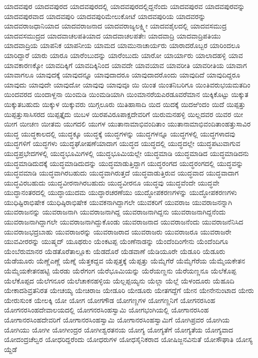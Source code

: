 {ಯಾದವಪುರ
ಯಾದವಪುರದ
ಯಾದವಪುರದಲ್ಲಿ
ಯಾದವಪುರದಲ್ಲಿದ್ದನೆಂದು
ಯಾದವಪುರವ
ಯಾದವಪುರವನ್ನು
ಯಾದವಪುರವಾದ
ಯಾದವಪುರಿ
ಯಾದವಪುರಿಮೇಲುಕೋಟೆ
ಯಾದವಪುರಿಯ
ಯಾದವರನ್ನು
ಯಾದವರಾಜಧಾನಿಯಾದ
ಯಾದವರಾಜನಾದ
ಯಾದವರಾಜ್ಯಲಕ್ಷ್ಮೀ
ಯಾದವಶೈಲದಲ್ಲಿ
ಯಾದವಸಮುದ್ರ
ಯಾದವಸಮುದ್ರದ
ಯಾದವಾಚಲಪತಿಯಾದ
ಯಾದವಾಚಲಪತೇಃ
ಯಾದವಾದ್ರಿ
ಯಾದವಾದ್ರಿಪತಿಯು
ಯಾದವಾದ್ರಿಯ
ಯಾಪನಿಕ
ಯಾಪನೀಯ
ಯಾಮದ
ಯಾಮುನಾಚಾರ್ಯರು
ಯಾರಾದರೊಬ್ಬರ
ಯಾರಿಂದಲೂ
ಯಾರಿದ್ದಾರೆ
ಯಾರು
ಯಾರೂ
ಯಾರೆಂಬುದನ್ನು
ಯಾರೆಂಬುದು
ಯಾರೋ
ಯಾರ್ಯಾರು
ಯಾಲಾದಹಳ್ಳಿ
ಯಾವ
ಯಾವಕಾರಣಕ್ಕೋ
ಯಾವದಿಕ್ಕಿಗೆ
ಯಾವದಿಕ್ಕಿನಿಂದ
ಯಾವದೇ
ಯಾವಯಾವ
ಯಾವರೀತಿ
ಯಾವರೀತಿಯ
ಯಾವಾಗ
ಯಾವಾಗಲೂ
ಯಾವುದಕ್ಕೆ
ಯಾವುದನ್ನೂ
ಯಾವುದಾದರೂ
ಯಾವುದಾದರೊಂದು
ಯಾವುದಿದೆ
ಯಾವುದಿದ್ದರೂ
ಯಾವುದು
ಯಾವುದೇ
ಯಾವುದೋ
ಯಾವುವು
ಯಾವುವೂ
ಯಿ
ಯಿಂತ
ಯಿಂತನಿಬರಿಗೂ
ಯಿಂತಿವರುಭಯಮತದಿಂ
ಯಿಂದವರದ
ಯಿಂದಾಳ್ದನಾ
ಯಿಂಮಡಿ
ಯಿಂಮಡಿಯಾಗಿ
ಯಿಂಮಾನರೆಯಎರಡೂವರೆಮಾನ
ಯಿಕ್ಕಿಕೊಟ್ಟು
ಯಿಕ್ಕುತ
ಯಿಕ್ಕುತಬಹುದು
ಯಿಕ್ಕುಳ
ಯಿಕ್ಕುವರು
ಯಿಗ್ಗಲೂರು
ಯಿತಿಹಾಸಾದಿ
ಯಿದ
ಯಿದಕ್ಕೆ
ಯಿದಱಿಂದಂ
ಯಿದೆ
ಯಿಪ್ಪತ್ತು
ಯಿಪ್ಪತ್ತುಸಾಸಿಸರದ
ಯಿಪ್ಪತ್ತೈದು
ಯಿಬಳ
ಯಿರಪವಿರೂಪಾಕ್ಷದೇವರಿಗೆ
ಯಿರುಮನಹಳ್ಳಿ
ಯಿಲ್ಲದವರ
ಯಿವರ
ಯೀ
ಯೀಗ
ಯೀಚಣ
ಯೀತಮ
ಯುಗದಲಿ
ಯುಗಳ
ಯುತಾನಾಮಾಭಿವಂದಿತಾಂ
ಯುತಾನಾಮಾಭಿವಂದಿತಾಂಹತ್ತುಸಾವಿರ
ಯುದ್ಧ
ಯುದ್ಧಕಾಲದಲ್ಲಿ
ಯುದ್ಧಕ್ಕೂ
ಯುದ್ಧಕ್ಕೆ
ಯುದ್ಧಗಳನ್ನು
ಯುದ್ಧಗಳನ್ನೂ
ಯುದ್ಧಗಳಲ್ಲಿ
ಯುದ್ಧಗಳಾದವು
ಯುದ್ಧಗಳಿಗೆ
ಯುದ್ಧಗಳು
ಯುದ್ಧಘೋಷಣೆಯಾದಾಗ
ಯುದ್ಧದ
ಯುದ್ಧದಲ್ಲಿ
ಯುದ್ಧದಲ್ಲೇ
ಯುದ್ಧಪಟುವಾಗುವ
ಯುದ್ಧಪ್ರಭೇದಗಳಲ್ಲಿ
ಯುದ್ಧಭೂಮಿಗಳಲ್ಲಿ
ಯುದ್ಧಭೂಮಿಯಲ್ಲೇ
ಯುದ್ಧಮಾಡಿ
ಯುದ್ಧಮಾಡಿದ
ಯುದ್ಧಮಾಡಿದನು
ಯುದ್ಧಮಾಡಿದುದಕ್ಕೆ
ಯುದ್ಧಮಾಡಿದುದನ್ನು
ಯುದ್ಧಮಾಡುತ್ತಿದ್ದಾಗ
ಯುದ್ಧರಂಗದ
ಯುದ್ಧರಂಗದಲ್ಲಿ
ಯುದ್ಧವನ್ನು
ಯುದ್ಧವಮಾಡಿ
ಯುದ್ಧವಾಗಿರಬಹುದು
ಯುದ್ಧವಾಗಿರುತ್ತದೆ
ಯುದ್ಧವಾಡುತ್ತಿರುವ
ಯುದ್ಧವಾದ
ಯುದ್ಧವಾದಾಗ
ಯುದ್ಧವಿರಬಹುದು
ಯುದ್ಧವೀರನಾಗಿರಬಹುದು
ಯುದ್ಧವೀರನೂ
ಯುದ್ಧವು
ಯುದ್ಧವೆಂದೇ
ಯುದ್ಧವೇ
ಯುದ್ಧಾನಂತರದಲ್ಲಿ
ಯುದ್ಧಾಯುದಮ
ಯುದ್ಧಾರಚರಣೆಯು
ಯುದ್ಧೋಪಕರಣಗಳನ್ನು
ಯುದ್ಧೋಪಕರಣಗಳು
ಯುಧಿಷ್ಟಿರಾಭಿಷೇಕ
ಯುಧಿಷ್ಠಿರಾಭಿಷೇಕ
ಯುವಕನಾಗಿದ್ದಾಗಲೇ
ಯುವಕರಿಗೆ
ಯುವರಾಜ
ಯುವರಾಜನನ್ನಾಗಿ
ಯುವರಾಜನನ್ನು
ಯುವರಾಜನಾಗಿ
ಯುವರಾಜನಾಗಿದ್ದ
ಯುವರಾಜನಾಗಿದ್ದನು
ಯುವರಾಜನಾಗಿದ್ದನೆಂದು
ಯುವರಾಜನಾಗಿದ್ದಾಗಲೇ
ಯುವರಾಜನಾಗಿದ್ದುಕೊಂಡು
ಯುವರಾಜನಾದ
ಯುವರಾಜನೆಂದು
ಯುವರಾಜನೆನಿಸಿದ
ಯುವರಾಜಭದ್ರಬಾಹು
ಯುವರಾಜರನ್ನು
ಯುವರಾಜರಾದ
ಯುವರಾಜರು
ಯುವರಾಜರೂ
ಯುವರಾಜರೇ
ಯುವವೀರರನ್ನು
ಯುಷ್ಮದ್
ಯೂಥರುಂ
ಯೆಂಕಟಪ್ಪ
ಯೆಂಣೆನಾಡನ್ನು
ಯೆಂದೆಂದಿಂಗೇನು
ಯೆಂದೆಂದಿಗೂ
ಯೆಂಬೆರುಮಾನರ
ಯೆಡತೊರೆತಾಲ್ಲೂಕು
ಯೆಡದೊರೆ
ಯೆಡವಾಣೆ
ಯೆಡಿಯೂರೇ
ಯೆಡೂರಿ
ಯೆಡೂರು
ಯೆಡೆಯೂರು
ಯೆಣ್ಣೆಎಣ್ಣೆ
ಯೆಣ್ನೆ
ಯೆತ್ತಕದ್ದವ
ಯೆಪ್ಪತ್ತಕ್ಕೆ
ಯೆಪ್ಪತ್ತು
ಯೆಮ್ಮೆಗೆರೆ
ಯೆಮ್ಮೆಗೆರೆಯ
ಯೆಮ್ಮೆಯಕೇತನ
ಯೆಮ್ಮೆಯಕೇತನಹಟ್ಟಿ
ಯೆರಡು
ಯೆರೆಗಂಗ
ಯೆರೆಭೂಮಿಯನ್ನು
ಯೆರೆಯಣ್ಣನು
ಯೆರೆಯಣ್ಣನೂ
ಯೆಲೆಕೊಪ್ಪ
ಯೆಲೆಕೊಪ್ಪದ
ಯೆಲೆಗನೂರ
ಯೆಲೆಚಾಕನಹಳ್ಳಿಯ
ಯೆಲ್ಲಪ್ಪಯ್ಯನು
ಯೆಲ್ಲಾ
ಯೆಲ್ಲೆ
ಯೆಳಂದೂರು
ಯೆಹೂದಿ
ಯೇಕಾದಶಿವ್ರತನಿರತ
ಯೇಚಯ್ಯ
ಯೇಚಿರಾಜ
ಯೇಡೂರಿ
ಯೇಡೂರು
ಯೇತಗದ್ದೆಗೆ
ಯೇನ
ಯೇನೇನುಂಟಾದ
ಯೇರು
ಯೇರುಸುಂಕ
ಯೇಲಕ್ಕಿ
ಯೋ
ಯೋಗ
ಯೋಗಗೌಡ
ಯೋಗಣ್ಣಗಳ
ಯೋಗಣ್ಣನಿಗೆ
ಯೋಗನರಸಿಂಹ
ಯೋಗನರಸಿಂಹದೇವಾಲಯದಲ್ಲಿ
ಯೋಗನರಸಿಂಹಸ್ವಾಮಿ
ಯೋಗಭಂಗಿಯಲ್ಲಿ
ಯೋಗಾನರಸಿಂಹ
ಯೋಗಾನರಸಿಂಹದೇವರಿಗೆ
ಯೋಗಾನರಸಿಂಹಸ್ವಾಮಿ
ಯೋಗಾನರಸಿಂಹಸ್ವಾಮಿಗೆ
ಯೋಗಿಪ್ರವರ
ಯೋಗಿಯ
ಯೋಗಿಯು
ಯೋಗೀ
ಯೋಗೀಂದ್ರರ
ಯೋಗೀಶ್ವರತನಯ
ಯೋಗ್ಯ
ಯೋಗ್ಯತೆಗೆ
ಯೋಗ್ಯತೆಯ
ಯೋಗ್ಯವಾದ
ಯೋದಂದ್ರಚೆಲ್ವರ
ಯೋಧರಿದ್ದರೆಂದು
ಯೋಧರುಗಳ
ಯೋಧಸೈನಿಕರಾದ
ಯೋಷಿಜ್ಜನವಿನುತೆ
ಯೋಸೌಘಾತಿ
ಯೋಸ್ಯ
ಯ್ದೆಡೆ
}
